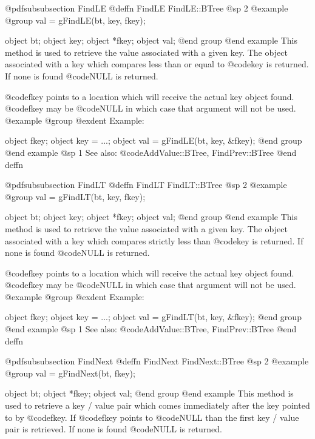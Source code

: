@pdfsubsubsection {FindLE}
@deffn {FindLE} FindLE::BTree
@sp 2
@example
@group
val = gFindLE(bt, key, fkey);

object  bt;
object  key;
object  *fkey;
object  val;
@end group
@end example
This method is used to retrieve the value associated with a given key.
The object associated with a key which compares less than or equal to
@code{key} is returned.  If none is found @code{NULL} is returned.

@code{fkey} points to a location which will receive the actual key
object found.  @code{fkey} may be @code{NULL} in which case that
argument will not be used.
@example
@group
@exdent Example:

object  fkey;
object  key = ...;
object  val = gFindLE(bt, key, &fkey);
@end group
@end example
@sp 1
See also:  @code{AddValue::BTree, FindPrev::BTree}
@end deffn












@pdfsubsubsection {FindLT}
@deffn {FindLT} FindLT::BTree
@sp 2
@example
@group
val = gFindLT(bt, key, fkey);

object  bt;
object  key;
object  *fkey;
object  val;
@end group
@end example
This method is used to retrieve the value associated with a given key.
The object associated with a key which compares strictly less than
@code{key} is returned.  If none is found @code{NULL} is returned.

@code{fkey} points to a location which will receive the actual key
object found.  @code{fkey} may be @code{NULL} in which case that
argument will not be used.
@example
@group
@exdent Example:

object  fkey;
object  key = ...;
object  val = gFindLT(bt, key, &fkey);
@end group
@end example
@sp 1
See also:  @code{AddValue::BTree, FindPrev::BTree}
@end deffn















@pdfsubsubsection {FindNext}
@deffn {FindNext} FindNext::BTree
@sp 2
@example
@group
val = gFindNext(bt, fkey);

object  bt;
object  *fkey;
object  val;
@end group
@end example
This method is used to retrieve a key / value pair which comes
immediately after the key pointed to by @code{fkey}.  If @code{fkey}
points to @code{NULL} than the first key / value pair is retrieved.  If
none is found @code{NULL} is returned.

